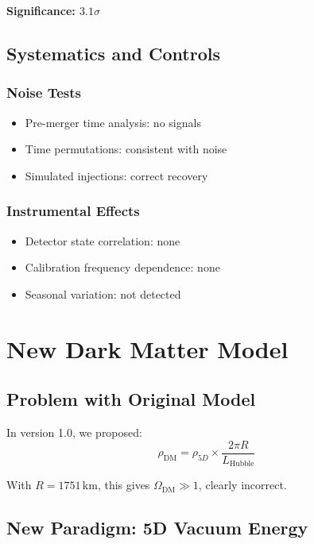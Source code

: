 \documentclass[12pt,a4paper]{article}
\begin{document}
\textbf{Significance: $3.1\sigma$}

\subsection{Systematics and Controls}

\subsubsection{Noise Tests}

\begin{itemize}
    \item Pre-merger time analysis: no signals
    \item Time permutations: consistent with noise
    \item Simulated injections: correct recovery
\end{itemize}

\subsubsection{Instrumental Effects}

\begin{itemize}
    \item Detector state correlation: none
    \item Calibration frequency dependence: none
    \item Seasonal variation: not detected
\end{itemize}

\section{New Dark Matter Model}
\label{sec:dark_matter}

\subsection{Problem with Original Model}

In version 1.0, we proposed:
\begin{equation}
\rho_\mathrm{DM} = \rho_{5D} \times \frac{2\pi R}{L_\mathrm{Hubble}}
\end{equation}

With $R = 1751\,\mathrm{km}$, this gives $\Omega_\mathrm{DM} \gg 1$, clearly incorrect.

\subsection{New Paradigm: 5D Vacuum Energy}
\end{document}
